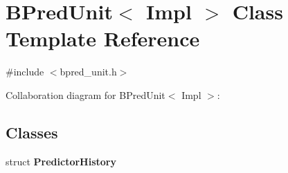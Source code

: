 \hypertarget{classBPredUnit}{
\section{BPredUnit$<$ Impl $>$ Class Template Reference}
\label{classBPredUnit}
}


{\ttfamily \#include $<$bpred\_\-unit.h$>$}



Collaboration diagram for BPredUnit$<$ Impl $>$:
\subsection*{Classes}
\begin{DoxyCompactItemize}
\item 
struct {\bfseries PredictorHistory}
\end{DoxyCompactItemize}
